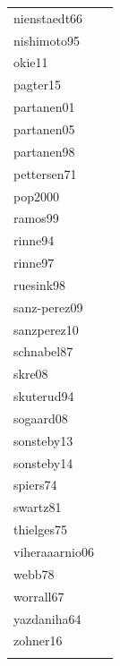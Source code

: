 \documentclass[11pt]{article}
\begin{document}
\begin{footnotesize}
\begin{longtable}{p{}p{}}
  nienstaedt66 & \citep{Nienstaedt:1966aa} \\ 
  nishimoto95 & \citep{Nishimoto:1994aa} \\ 
  okie11 & \citep{Okie:2011aa} \\ 
  pagter15 & \citep{Pagter:2015} \\ 
  partanen01 & \citep{Partanen:2001aa} \\ 
  partanen05 & \citep{Partanen:2005aa} \\ 
  partanen98 & \citep{Partanen:1998aa} \\ 
  pettersen71 & \citep{Pettersen:1972aa} \\ 
  pop2000 & \citep{Pop:2000aa} \\ 
  ramos99 & \citep{ramos:1999} \\ 
  rinne94 & \citep{Rinne:1994} \\ 
  rinne97 & \citep{Rinne:1997aa} \\ 
  ruesink98 & \citep{Ruesink:1998aa} \\ 
  sanz-perez09 & \citep{Sanz-Perez:2009aa} \\ 
  sanzperez10 & \citep{Sanz-Perez:2010aa} \\ 
  schnabel87 & \citep{Schnabel:1987aa} \\ 
  skre08 & \citep{Skre:2008aa} \\ 
  skuterud94 & \citep{Skuterud:1994aa} \\ 
  sogaard08 & \citep{Sogaard:2008aa} \\ 
  sonsteby13 & \citep{Sonsteby:2013aa} \\ 
  sonsteby14 & \citep{Sonsteby:2014aa} \\ 
  spiers74 & \citep{Spiers:1974aa} \\ 
  swartz81 & \citep{Swartz:1981aa} \\ 
  thielges75 & \citep{Thielges:1976aa} \\ 
  viheraaarnio06 & \citep{Vihera-Aarnio:2006aa} \\ 
  webb78 & \citep{Webb:1977} \\ 
  worrall67 & \citep{Worrall:1967aa} \\ 
  yazdaniha64 & \citep{Yazdaniha:1967aa} \\ 
  zohner16 & \citep{zohner2016} \\ 
  \hline
\label{tab:ref}
\end{longtable}
\endgroup\end{footnotesize} 

\pagebreak
\end{document}

